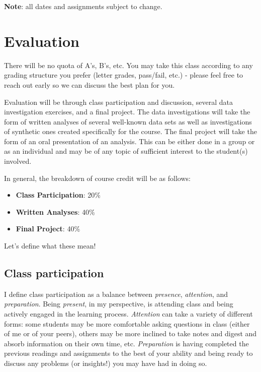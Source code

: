 \documentclass[
]{book}
\providecommand{\tightlist}{%
  \setlength{\itemsep}{0pt}\setlength{\parskip}{0pt}}
\begin{document}
\textbf{Note}: all dates and assignments subject to change.

\hypertarget{evaluation}{%
\section*{Evaluation}\label{evaluation}}

There will be no quota of A's, B's, etc. You may take this class according to any grading structure you prefer (letter grades, pass/fail, etc.) - please feel free to reach out early so we can discuss the best plan for you.

Evaluation will be through class participation and discussion, several data investigation exercises, and a final project. The data investigations will take the form of written analyses of several well-known data sets as well as investigations of synthetic ones created specifically for the course. The final project will take the form of an oral presentation of an analysis. This can be either done in a group or as an individual and may be of any topic of sufficient interest to the student(s) involved.

In general, the breakdown of course credit will be as follows:

\begin{itemize}
\tightlist
\item
  \textbf{Class Participation}: 20\%
\item
  \textbf{Written Analyses}: 40\%
\item
  \textbf{Final Project}: 40\%
\end{itemize}

Let's define what these mean!

\hypertarget{class-participation}{%
\subsection*{Class participation}\label{class-participation}}

I define class participation as a balance between \emph{presence}, \emph{attention}, and \emph{preparation}. Being \emph{present}, in my perspective, is attending class and being actively engaged in the learning process. \emph{Attention} can take a variety of different forms: some students may be more comfortable asking questions in class (either of me or of your peers), others may be more inclined to take notes and digest and absorb information on their own time, etc. \emph{Preparation} is having completed the previous readings and assignments to the best of your ability and being ready to discuss any problems (or insights!) you may have had in doing so.
\end{document}
